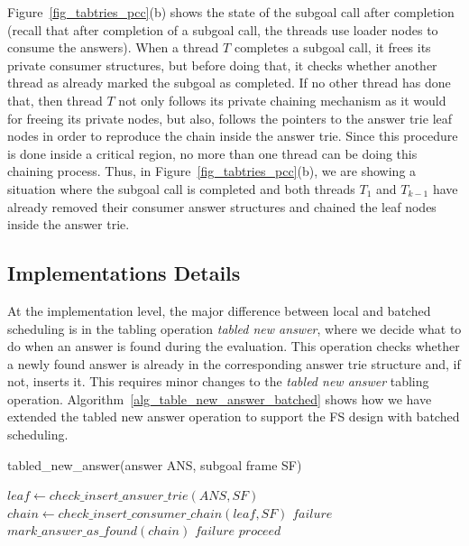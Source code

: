 \documentclass{llncs}
\begin{document}
Figure~\ref{fig_tabtries_pcc}(b) shows the state of the subgoal call
after completion (recall that after completion of a subgoal call, the
threads use loader nodes to consume the answers). When a thread $T$
completes a subgoal call, it frees its private consumer structures,
but before doing that, it checks whether another thread as already
marked the subgoal as completed. If no other thread has done that,
then thread $T$ not only follows its private chaining mechanism as it
would for freeing its private nodes, but also, follows the pointers to
the answer trie leaf nodes in order to reproduce the chain inside the
answer trie. Since this procedure is done inside a critical region, no
more than one thread can be doing this chaining process. Thus, in
Figure~\ref{fig_tabtries_pcc}(b), we are showing a situation where the
subgoal call is completed and both threads $T_1$ and $T_{k-1}$ have
already removed their consumer answer structures and chained the leaf
nodes inside the answer trie.

\subsection{Implementations Details}

At the implementation level, the major difference between local and
batched scheduling is in the tabling operation \emph{tabled new
  answer}, where we decide what to do when an answer is found during
the evaluation. This operation checks whether a newly found answer is
already in the corresponding answer trie structure and, if not,
inserts it. This requires minor changes to the \emph{tabled new
  answer} tabling
operation. Algorithm~\ref{alg_table_new_answer_batched} shows how we
have extended the tabled new answer operation to support the FS design
with batched scheduling.

\begin{algorithm} [!ht]
\caption{tabled\_new\_answer(answer ANS, subgoal frame SF)}
\begin{algorithmic}[1]
  \STATE $leaf \gets check\_insert\_answer\_trie(ANS, SF)$
  \STATE $chain \gets check\_insert\_consumer\_chain(leaf, SF)$
    \RETURN $failure$
    \STATE $mark\_answer\_as\_found(chain)$
      \RETURN $failure$
      \RETURN $proceed$
    \ENDIF
  \ENDIF  
\end{algorithmic}
\label{alg_table_new_answer_batched}
\end{algorithm}
\end{document}

